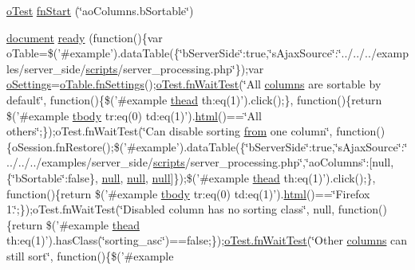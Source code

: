 \begin{DoxyCompactItemize}
\item 
\hyperlink{unit__test_8js_a3b2d259e2df3b6860d9047a92d09d0d6}{o\+Test} \hyperlink{4__server-side_2ao_columns_8b_sortable_8js_a24cd54e61ab1ae2f0b9c7c430c45b1a5}{fn\+Start} (\char`\"{}ao\+Columns.\+b\+Sortable\char`\"{})
\item 
\hyperlink{outside_events_8js_aa14f8e0338cced6720590fd2ea13bd4b}{document} \hyperlink{4__server-side_2ao_columns_8b_sortable_8js_a785d82a43969af3bd34845209fe26dae}{ready} (function()\{var o\+Table=\$('\#example').data\+Table(\{\char`\"{}b\+Server\+Side\char`\"{}\+:true,\char`\"{}s\+Ajax\+Source\char`\"{}\+:\char`\"{}../../../examples/server\+\_\+side/\hyperlink{tinymce_8jquery_8dev_8js_a09066d4d580eeec222f858d588b4cdef}{scripts}/server\+\_\+processing.\+php\char`\"{}\});var \hyperlink{model_8settings_8js_a4857b9c813b4dea010668e9555d0aca7}{o\+Settings}=\hyperlink{api_8methods_8js_a78f387fab92a85c2cb7830bc5d8a6141}{o\+Table.\+fn\+Settings}();\hyperlink{onhold_24__server-side_2__zero__config_8js_ab25c4d596771c0133cdc45178ce72c3d}{o\+Test.\+fn\+Wait\+Test}(\char`\"{}All \hyperlink{model_8defaults_8columns_8js_af310571d7a4fac04bd949bdefb852a47}{columns} are sortable by default\char`\"{}, function()\{\$('\#example \hyperlink{core_8constructor_8js_a856be760b6816c9591ce69f0a2b43693}{thead} th\+:eq(1)').click();\}, function()\{return \$('\#example \hyperlink{core_8constructor_8js_a99b0542c7c50fe8757c55bf9dac5f3be}{tbody} tr\+:eq(0) td\+:eq(1)').\hyperlink{tinymce_8jquery_8dev_8js_ac2090bcf2ff968c0083d5de53a6544f3}{html}()==\char`\"{}All others\char`\"{};\});o\+Test.\+fn\+Wait\+Test(\char`\"{}Can disable sorting \hyperlink{jquery-ui_8js_ace03b192fd101a1c5648340bc09b7229}{from} one column\char`\"{}, function()\{o\+Session.\+fn\+Restore();\$('\#example').data\+Table(\{\char`\"{}b\+Server\+Side\char`\"{}\+:true,\char`\"{}s\+Ajax\+Source\char`\"{}\+:\char`\"{}../../../examples/server\+\_\+side/\hyperlink{tinymce_8jquery_8dev_8js_a09066d4d580eeec222f858d588b4cdef}{scripts}/server\+\_\+processing.\+php\char`\"{},\char`\"{}ao\+Columns\char`\"{}\+:\mbox{[}null,\{\char`\"{}b\+Sortable\char`\"{}\+:false\}, \hyperlink{validate_8js_afb8e110345c45e74478894341ab6b28e}{null}, \hyperlink{validate_8js_afb8e110345c45e74478894341ab6b28e}{null}, \hyperlink{validate_8js_afb8e110345c45e74478894341ab6b28e}{null}\mbox{]}\});\$('\#example \hyperlink{core_8constructor_8js_a856be760b6816c9591ce69f0a2b43693}{thead} th\+:eq(1)').click();\}, function()\{return \$('\#example \hyperlink{core_8constructor_8js_a99b0542c7c50fe8757c55bf9dac5f3be}{tbody} tr\+:eq(0) td\+:eq(1)').\hyperlink{tinymce_8jquery_8dev_8js_ac2090bcf2ff968c0083d5de53a6544f3}{html}()==\char`\"{}Firefox 1.\char`\"{};\});o\+Test.\+fn\+Wait\+Test(\char`\"{}Disabled column has no sorting class\char`\"{}, null, function()\{return \$('\#example \hyperlink{core_8constructor_8js_a856be760b6816c9591ce69f0a2b43693}{thead} th\+:eq(1)').has\+Class(\char`\"{}sorting\+\_\+asc\char`\"{})==false;\});\hyperlink{onhold_24__server-side_2__zero__config_8js_ab25c4d596771c0133cdc45178ce72c3d}{o\+Test.\+fn\+Wait\+Test}(\char`\"{}Other \hyperlink{model_8defaults_8columns_8js_af310571d7a4fac04bd949bdefb852a47}{columns} can still sort\char`\"{}, function()\{\$('\#example 
\end{DoxyCompactItemize}
